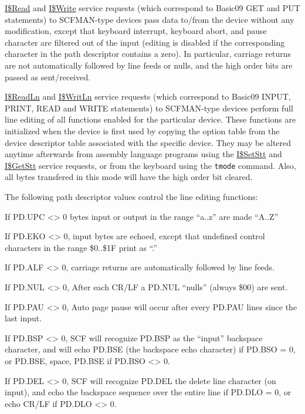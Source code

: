 \documentclass[
]{article}
\begin{document}
\hyperref[i.read]{I\$Read} and \hyperref[i.write]{I\$Write} service
requests (which correspond to Basic09 GET and PUT statements) to
SCFMAN-type devices pass data to/from the device without any
modification, except that keyboard interrupt, keyboard abort, and pause
character are filtered out of the input (editing is disabled if the
corresponding character in the path descriptor contains a zero). In
particular, carriage returns are not automatically followed by line
feeds or nulls, and the high order bits are passed as sent/received.

\hyperref[i.readln]{I\$ReadLn} and \hyperref[i.writln]{I\$WritLn}
service requests (which correspond to Basic09 INPUT, PRINT, READ and
WRITE statements) to SCFMAN-type devices perform full line editing of
all functions enabled for the particular device. These functions are
initialized when the device is first used by copying the option table
from the device descriptor table associated with the specific device.
They may be altered anytime afterwards from assembly language programs
using the \hyperref[i.setstt]{I\$SetStt} and
\hyperref[i.getstt]{I\$GetStt} service requests, or from the keyboard
using the \texttt{tmode} command. Also, all bytes transfered in this
mode will have the high order bit cleared.

The following path descriptor values control the line editing functions:

If PD.UPC \textless\textgreater{} 0 bytes input or output in the range
``a..z'' are made ``A..Z''

If PD.EKO \textless\textgreater{} 0, input bytes are echoed, except that
undefined control characters in the range \$0..\$1F print as ``.''

If PD.ALF \textless\textgreater{} 0, carriage returns are automatically
followed by line feeds.

If PD.NUL \textless\textgreater{} 0, After each CR/LF a PD.NUL ``nulls''
(always \$00) are sent.

If PD.PAU \textless\textgreater{} 0, Auto page pause will occur after
every PD.PAU lines since the last input.

If PD.BSP \textless\textgreater{} 0, SCF will recognize PD.BSP as the
``input'' backspace character, and will echo PD.BSE (the backspace echo
character) if PD.BSO = 0, or PD.BSE, space, PD.BSE if PD.BSO
\textless\textgreater{} 0.

If PD.DEL \textless\textgreater{} 0, SCF will recognize PD.DEL the
delete line character (on input), and echo the backspace sequence over
the entire line if PD.DLO = 0, or echo CR/LF if PD.DLO
\textless\textgreater{} 0.
\end{document}
